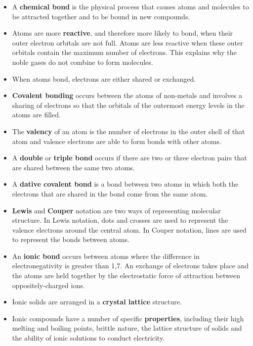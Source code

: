       
      \label{m38689*id147386}\begin{itemize}[noitemsep]
            \label{m38689*uid136}\item A \textbf{chemical bond} is the physical process that causes atoms and molecules to be attracted together and to be bound in new compounds.
\label{m38689*uid137}\item Atoms are more \textbf{reactive}, and therefore more likely to bond, when their outer electron orbitals are not full. Atoms are less reactive when these outer orbitals contain the maximum number of electrons. This explains why the noble gases do not combine to form molecules.
\label{m38689*uid142}\item When atoms bond, electrons are either shared or exchanged.
\label{m38689*uid143}\item \textbf{Covalent bonding} occurs between the atoms of non-metals and involves a sharing of electrons so that the orbitals of the outermost energy levels in the atoms are filled.
\label{m38689*uid144}\item The \textbf{valency} of an atom is the number of electrons in the outer shell of that atom and valence electrons are able to form bonds with other atoms.
\label{m38689*uid145}\item A \textbf{double} or \textbf{triple bond} occurs if there are two or three electron pairs that are shared between the same two atoms.
\label{m38689*uid146}\item A \textbf{dative covalent bond} is a bond between two atoms in which both the electrons that are shared in the bond come from the same atom.
\label{m38689*uid147}\item \textbf{Lewis} and \textbf{Couper} notation are two ways of representing molecular structure. In Lewis notation, dots and crosses are used to represent the valence electrons around the central atom. In Couper notation, lines are used to represent the bonds between atoms.
\label{m38689*uid150}\item An \textbf{ionic bond} occurs between atoms where the difference in electronegativity is greater than 1,7. An exchange of electrons takes place and the atoms are held together by the electrostatic force of attraction between oppositely-charged ions.
\label{m38689*uid151}\item Ionic solids are arranged in a \textbf{crystal lattice} structure.
\label{m38689*uid152}\item Ionic compounds have a number of specific \textbf{properties}, including their high melting and boiling points, brittle nature, the lattice structure of solids and the ability of ionic solutions to conduct electricity.

\end{itemize}
